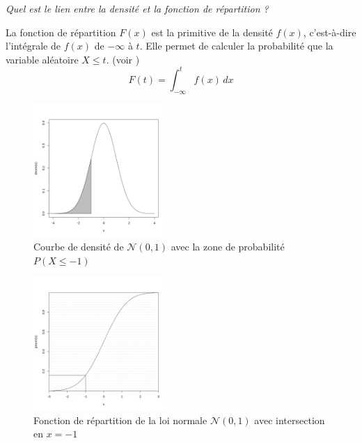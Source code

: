             \begin{center}
                \textit{Quel est le lien entre la densité et la fonction de répartition ?}
            \end{center}

            La fonction de répartition $F(x)$ est la primitive de la densité $f(x)$, c'est-à-dire l'intégrale de $f(x)$ de $-\infty$ à $t$. 
            Elle permet de calculer la probabilité que la variable aléatoire $X \leq t$. (voir \cite{fct_repartition})
            \[
                F(t) = \int_{-\infty}^t f(x)\,dx
            \]
            \begin{table}[H]
                \centering
                \begin{minipage}{0.42\textwidth}
                    \begin{figure}[H]
                        \centering
                        \includegraphics[width=0.45\textwidth]{4_attachments/figures/output26.png}
                        \caption{Courbe de densité de $\mathcal N(0,1)$ avec la zone de probabilité $P(X\leq -1)$}                
                        \label{fig:anal1}
                    \end{figure}
                \end{minipage}
                \hfill
                \begin{minipage}{0.42\textwidth}
                    \centering
                    \begin{figure}[H]
                        \centering
                        \includegraphics[width=0.45\textwidth]{4_attachments/figures/output27.png}
                        \caption{Fonction de répartition de la loi normale $\mathcal N(0,1)$ avec intersection en $x=-1$}              
                        \label{fig:anal2}
                    \end{figure}
                \end{minipage}
            \end{table}

